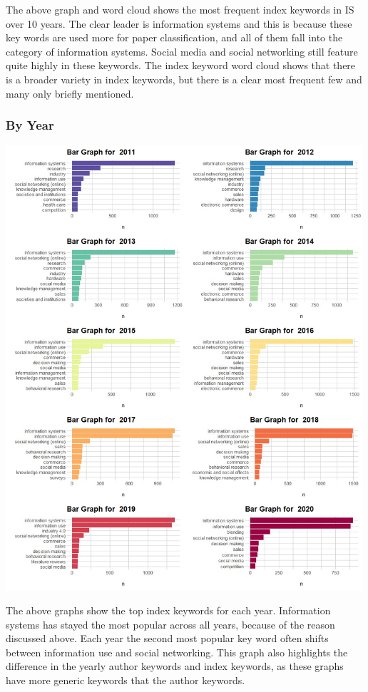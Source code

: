 \documentclass[
  letterpaper,
  DIV=11,
  numbers=noendperiod]{scrartcl}
\begin{document}
The above graph and word cloud shows the most frequent index keywords in
IS over 10 years. The clear leader is information systems and this is
because these key words are used more for paper classification, and all
of them fall into the category of information systems. Social media and
social networking still feature quite highly in these keywords. The
index keyword word cloud shows that there is a broader variety in index
keywords, but there is a clear most frequent few and many only briefly
mentioned.

\hypertarget{by-year-1}{%
\subsubsection{By Year}\label{by-year-1}}

\includegraphics[width=5.20833in,height=\textheight]{images/bargraphbyyearIndex.jpg}

The above graphs show the top index keywords for each year. Information
systems has stayed the most popular across all years, because of the
reason discussed above. Each year the second most popular key word often
shifts between information use and social networking. This graph also
highlights the difference in the yearly author keywords and index
keywords, as these graphs have more generic keywords that the author
keywords.
\end{document}
